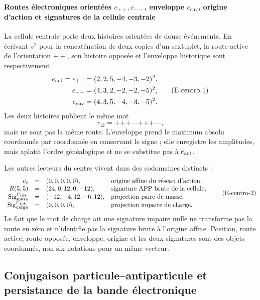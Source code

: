 \paragraph{Routes électroniques orientées \(e_{++},e_{--}\), enveloppe \(e_{\mathrm{env}}\), origine d'action et signatures de la cellule centrale}
La cellule centrale porte deux histoires orientées de douze événements. En écrivant
\(v^2\) pour la concaténation de deux copies d'un sextuplet, la route active
de l'orientation \({++}\), son histoire opposée et l'enveloppe historique
sont respectivement
\[
\begin{aligned}
 e_{\rm act}=e_{++}
   &=(2,2,5,-4,-3,-2)^2,\\
 e_{--}
   &=(4,3,2,-2,-2,-5)^2,\\
 e_{\rm env}
   &=(4,3,5,-4,-3,-5)^2.
\end{aligned}
\tag{E-centro-1}\label{eq:electron-rutas-finas-rev8}
\]
Les deux histoires publient le même mot
\[
 \tau_{12}=\texttt{+++---+++---},
\]
mais ne sont pas la même route. L'enveloppe prend le maximum absolu
coordonnée par coordonnée en conservant le signe ; elle enregistre les amplitudes, mais
aplatit l'ordre généalogique et ne se substitue pas à \(e_{\rm act}\).

Les autres lecteurs du centre vivent dans des codomaines distincts :
\[
\begin{array}{rcll}
 v_e&=&(0,0,0,0,0),
   &\text{origine affine du réseau d’action},\\
 R(5,5)&=&(24,0,12,0,-12),
   &\text{signature APP brute de la cellule},\\
 \operatorname{Sig}^{\Gamma_{108}}_{\rm masa}
   &=&(-12,-4,12,-6,12),
   &\text{projection paire de masse},\\
 \operatorname{Sig}^{\Gamma_{108}}_{\rm carga}
   &=&(0,0,0,0),
   &\text{projection impaire de charge}.
\end{array}
\tag{E-centro-2}\label{eq:electron-firmas-tipadas-rev8}
\]
Le fait que le mot de charge ait une signature impaire nulle ne transforme pas la route en
zéro et n'identifie pas la signature brute à l'origine affine. Position, route
active, route opposée, enveloppe, origine et les deux signatures sont des objets
coordonnés, non six notations pour un même vecteur.

\subsection{Conjugaison particule–antiparticule et persistance de la bande électronique}

